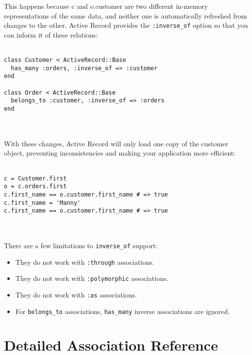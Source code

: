 \documentclass[10pt]{book}
\begin{document}
This happens because c and o.customer are two different in-memory  representations of the same data, and neither one is automatically  refreshed from changes to the other. Active Record provides the \texttt{:inverse\_of} option so that you can inform it of these relations:
\\ \\
\begin{minipage}{\textwidth}{\scriptsize
\begin{verbatim}
class Customer < ActiveRecord::Base
  has_many :orders, :inverse_of => :customer
end
 
class Order < ActiveRecord::Base
  belongs_to :customer, :inverse_of => :orders
end
\end{verbatim}}
\end{minipage}
\\ \\

With these changes, Active Record will only load one copy of the  customer object, preventing inconsistencies and making your application  more efficient:
\\ \\
\begin{minipage}{\textwidth}{\scriptsize
\begin{verbatim}
c = Customer.first
o = c.orders.first
c.first_name == o.customer.first_name # => true
c.first_name = 'Manny'
c.first_name == o.customer.first_name # => true
\end{verbatim}}
\end{minipage}
\\ \\

There are a few limitations to \texttt{inverse\_of} support:
\begin{itemize}
	\item They do not work with \texttt{:through} associations.
	\item They do not work with \texttt{:polymorphic} associations.
	\item They do not work with \texttt{:as} associations.
	\item For \texttt{belongs\_to} associations, \texttt{has\_many} inverse associations are ignored.
\end{itemize}

\section{ Detailed Association Reference}
\end{document}
